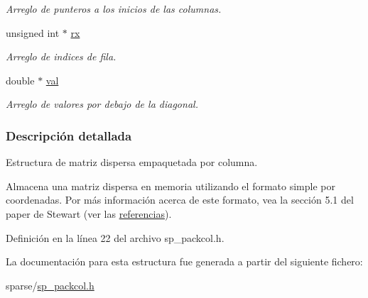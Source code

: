 \begin{CompactItemize}
\begin{CompactList}\small\item\em Arreglo de punteros a los inicios de las columnas. \item\end{CompactList}\item 
\hypertarget{structsp__packcol_536659b700c3b21fd5d6cf8538c82b6f}{
unsigned int $\ast$ \hyperlink{structsp__packcol_536659b700c3b21fd5d6cf8538c82b6f}{rx}}
\label{structsp__packcol_536659b700c3b21fd5d6cf8538c82b6f}

\begin{CompactList}\small\item\em Arreglo de indices de fila. \item\end{CompactList}\item 
\hypertarget{structsp__packcol_6315b3a8ee78ac66aaae5ba79bda252e}{
double $\ast$ \hyperlink{structsp__packcol_6315b3a8ee78ac66aaae5ba79bda252e}{val}}
\label{structsp__packcol_6315b3a8ee78ac66aaae5ba79bda252e}

\begin{CompactList}\small\item\em Arreglo de valores por debajo de la diagonal. \item\end{CompactList}\end{CompactItemize}


\subsubsection{Descripción detallada}
Estructura de matriz dispersa empaquetada por columna. 

Almacena una matriz dispersa en memoria utilizando el formato simple por coordenadas. Por más información acerca de este formato, vea la sección 5.1 del paper de Stewart (ver las \hyperlink{index_refsec}{referencias}). 

Definición en la línea 22 del archivo sp\_\-packcol.h.

La documentación para esta estructura fue generada a partir del siguiente fichero:\begin{CompactItemize}
\item 
sparse/\hyperlink{sp__packcol_8h}{sp\_\-packcol.h}\end{CompactItemize}
